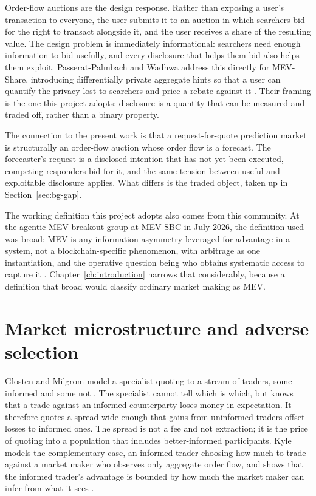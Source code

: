 Order-flow auctions are the design response. Rather than exposing a user's transaction to
everyone, the user submits it to an auction in which searchers bid for the right to
transact alongside it, and the user receives a share of the resulting value. The design
problem is immediately informational: searchers need enough information to bid usefully, and
every disclosure that helps them bid also helps them exploit. Passerat-Palmbach and Wadhwa
address this directly for MEV-Share, introducing differentially private aggregate hints so
that a user can quantify the privacy lost to searchers and price a rebate against it
\cite{passeratpalmbach2025dphints}. Their framing is the one this project adopts: disclosure
is a quantity that can be measured and traded off, rather than a binary property.

The connection to the present work is that a request-for-quote prediction market is
structurally an order-flow auction whose order flow is a forecast. The forecaster's request
is a disclosed intention that has not yet been executed, competing responders bid for it,
and the same tension between useful and exploitable disclosure applies. What differs is the
traded object, taken up in Section~\ref{sec:bg-gap}.

The working definition this project adopts also comes from this community. At the agentic
MEV breakout group at MEV-SBC in July 2026, the definition used was broad: MEV is any
information asymmetry leveraged for advantage in a system, not a blockchain-specific
phenomenon, with arbitrage as one instantiation, and the operative question being who
obtains systematic access to capture it \cite{mevsbc2026breakout}.
Chapter~\ref{ch:introduction} narrows that considerably, because a definition that broad
would classify ordinary market making as MEV.

\section{Market microstructure and adverse selection}
\label{sec:bg-micro}

Glosten and Milgrom model a specialist quoting to a stream of traders, some informed and
some not \cite{glosten1985bidask}. The specialist cannot tell which is which, but knows that
a trade against an informed counterparty loses money in expectation. It therefore quotes a
spread wide enough that gains from uninformed traders offset losses to informed ones. The
spread is not a fee and not extraction; it is the price of quoting into a population that
includes better-informed participants. Kyle models the complementary case, an informed
trader choosing how much to trade against a market maker who observes only aggregate order
flow, and shows that the informed trader's advantage is bounded by how much the market maker
can infer from what it sees \cite{kyle1985continuous}.

